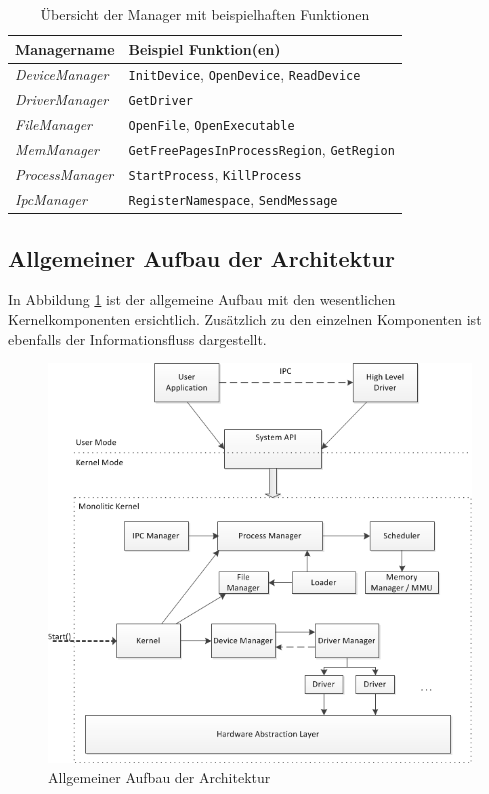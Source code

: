 \begin{table}[H]
\begin{tabular}{p{4cm} | p{9cm}}
  \textbf{Managername} & \textbf{Beispiel Funktion(en)} \\ 
  \hline
  \textit{DeviceManager} & \texttt{InitDevice}, \texttt{OpenDevice}, \texttt{ReadDevice} \\
  \textit{DriverManager} & \texttt{GetDriver} \\
  \textit{FileManager} & \texttt{OpenFile}, \texttt{OpenExecutable} \\
  \textit{MemManager} & \texttt{GetFreePagesInProcessRegion}, \texttt{GetRegion} \\
  \textit{ProcessManager} & \texttt{StartProcess}, \texttt{KillProcess} \\
  \textit{IpcManager} & \texttt{RegisterNamespace}, \texttt{SendMessage} \\
 \end{tabular}
 \caption{Übersicht der Manager mit beispielhaften Funktionen}
 \label{table:Manager-function}
\end{table}

\subsection{Allgemeiner Aufbau der Architektur}
\label{section:generalArchitecture}
In Abbildung \ref{fig:general-Architecture} ist der allgemeine Aufbau mit den wesentlichen Kernelkomponenten ersichtlich. Zusätzlich zu den einzelnen Komponenten ist ebenfalls der Informationsfluss dargestellt.

\begin{figure}[H]
	\includegraphics[scale=0.9]{chapters/architecture/figures/architecture}
	\caption{Allgemeiner Aufbau der Architektur}
	\label{fig:general-Architecture}
\end{figure}

